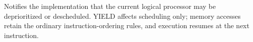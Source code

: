 Notifies the implementation that the current logical processor may be deprioritized or descheduled. YIELD affects scheduling only; memory accesses retain the ordinary instruction-ordering rules, and execution resumes at the next instruction.
